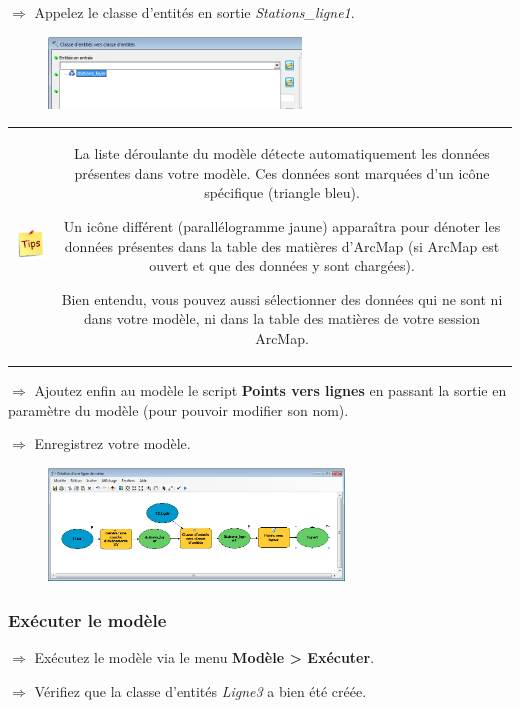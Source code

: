 \documentclass[11pt]{article}
\newcommand{\action}{$\Rightarrow$ }
\newenvironment{note}{%
	\begin{tabular}[t t]{c c}
		\includegraphics{img/tips.png}
		 &
		\begin{minipage}[c]{0.9\linewidth}
			\begin{sffamily}
}{%
			\end{sffamily}
		\end{minipage}
	\end{tabular}
}
\begin{document}
\action Appelez le classe d'entités en sortie \textit{Stations\_ligne1}.

\begin{figure}[H]
	\center \includegraphics[width=0.6\textwidth]{img/td3/modelbuilder_creation-4.png}\\
\end{figure}

\begin{note}
La liste déroulante du modèle détecte automatiquement les données présentes dans votre modèle. Ces données sont marquées d'un icône spécifique (triangle bleu).

Un icône différent (parallélogramme jaune) apparaîtra pour dénoter les données présentes dans la table des matières d'ArcMap (si ArcMap est ouvert et que des données y sont chargées).

Bien entendu, vous pouvez aussi sélectionner des données qui ne sont ni dans votre modèle, ni dans la table des matières de votre session ArcMap.
\end{note}

\action Ajoutez enfin au modèle le script \textbf{Points vers lignes} en passant la sortie en paramètre du modèle (pour pouvoir modifier son nom).

\action Enregistrez votre modèle.
\begin{figure}[H]
	\center \includegraphics[width=0.7\textwidth]{img/td3/modelbuilder_creation-5.png}\\
\end{figure}

\subsubsection{Exécuter le modèle}
\action Exécutez le modèle via le menu \textbf{Modèle > Exécuter}.

\action Vérifiez que la classe d'entités \textit{Ligne3} a bien été créée.
\end{document}
